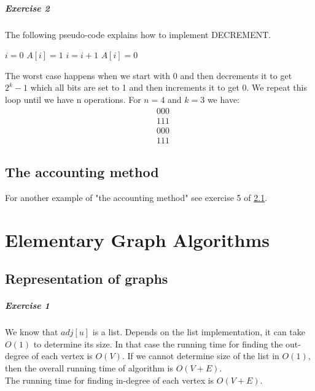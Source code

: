 \documentclass{book}
\begin{document}
	\paragraph{Exercise 2}
	The following pseudo-code explains how to implement DECREMENT.
	\begin{algorithm*}[h!]
		\begin{algorithmic}[1]
			\State $i = 0$
			\State $A[i] = 1$
			\State $i = i + 1$
			\EndWhile
			\State $A[i] = 0$
			\EndIf
			\EndFunction
		\end{algorithmic}
	\end{algorithm*}
	The worst case happens when we start with 0 and then decrements it to get $2^k - 1$ which all bits are set to 1 and then increments it to get 0. We repeat this loop until we have n operations. For $n = 4$ and $k = 3$ we have:
	\begin{align*}
		&000 \\
		&111 \\
		&000 \\
		&111
	\end{align*}
	\section{The accounting method}
	For another example of "the accounting method" see exercise 5 of \ref{sec:Representation of graphs}.
	\chapter{Elementary Graph Algorithms}
	\section{Representation of graphs}
	\label{sec:Representation of graphs}
	\paragraph{Exercise 1}
	We know that $adj[u]$ is a list. Depends on the list implementation, it can take $O(1)$ to determine its size. In that case the running time for finding the out-degree of each vertex is $O(V)$. If we cannot determine size of the list in $O(1)$, then the overall running time of algorithm is $O(V + E)$. \\
	The running time for finding in-degree of each vertex is $O(V + E)$.
\end{document}
